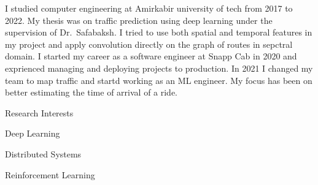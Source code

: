 

\begin{cvparagraph}
I studied computer engineering at Amirkabir university of tech from 2017 to 2022.
My thesis was on traffic prediction using deep learning under the supervision of
Dr.~Safabaksh. I tried to use both spatial and temporal features in my project and apply
convolution directly on the graph of routes in sepctral domain.
I started my career as a software engineer at Snapp Cab in 2020
and exprienced managing and deploying projects to production.
In 2021 I changed my team to map traffic and startd working as an ML engineer.
My focus has been on better estimating the time of arrival of a ride.

\vspace{5mm}

  \cventry
    {}
    {Research Interests}
    {}
    {}
    {
      \begin{cvitems}
        \item {Deep Learning}
        \item {Distributed Systems}
        \item {Reinforcement Learning}
      \end{cvitems}
    }

\end{cvparagraph}
